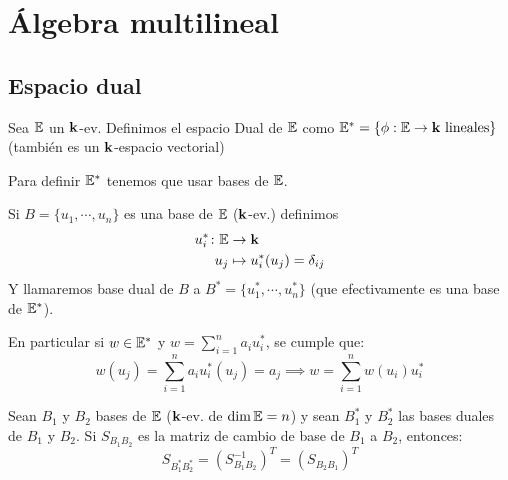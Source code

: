 \section{Álgebra multilineal}




\subsection{Espacio dual}

\begin{defi}
	Sea $\mathbb{E}$ un $\mathbf{k}$-ev. Definimos el espacio Dual de $\mathbb{E}$ como
	$\mathbb{E}^* = \{ \phi : \mathbb{E} \to \mathbf{k} \text{ lineales} \}$ (también es un
	$\mathbf{k}$-espacio vectorial)
\end{defi}
\begin{obs}
	Para definir $\mathbb{E}^*$ tenemos que usar bases de $\mathbb{E}$.
\end{obs}
\begin{defi}
	Si $B = \{ u_1,\cdots, u_n \}$ es una base de $\mathbb{E}$ ($\mathbf{k}$-ev.)
	definimos
	\[
		\begin{aligned}
			u_i^* \colon \mathbb{E} &\to \mathbf{k}\\
			u_j &\mapsto u_i^*(u_j) = \delta_{ij}
		\end{aligned}
	\]
	Y llamaremos base dual de $B$ a
	$B^* = \{ u_1^*, \cdots, u_n^* \}$ (que efectivamente es una
	base de $\mathbb{E}^*$).
\end{defi}
\begin{obs}
	En particular si $w \in \mathbb{E}^*$ y
	$\displaystyle w = \sum_{i=1}^{n} a_i u_i^*$, se cumple que:
	\[
		w(u_j) = \sum_{i=1}^{n} a_i u_i^*(u_j) = a_j
		\implies
		w = \sum_{i=1}^{n}w(u_i)u_i^*
	\]
\end{obs}

\begin{prop}
	Sean $B_1$ y $B_2$ bases de $\mathbb{E}$ ($\mathbf{k}$-ev. de $\dim  \mathbb{E} = n$) y
	sean $B_1^*$ y $B_2^*$ las bases duales de $B_1$ y $B_2$.
	Si $S_{B_1B_2}$ es la matriz de cambio de base de $B_1$ a
	$B_2$, entonces:
	\[
		S_{B_1^*B_2^*} = (S_{B_1B_2}^{-1})^T = (S_{B_2B_1})^T
	\]
\end{prop}

